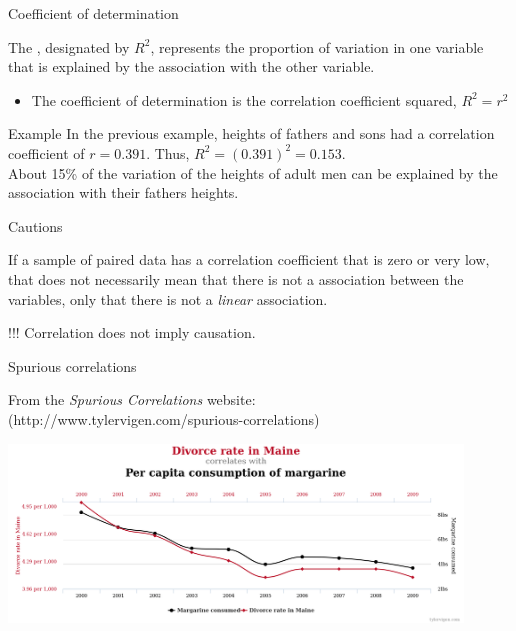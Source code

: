 \documentclass[xcolor=table, handout]{beamer}
\begin{document}
\begin{frame}{Coefficient of determination}
\begin{block}{}
\large
The , designated by $R^2$, represents the proportion of variation in one variable that is explained by the association with the other variable.
\begin{itemize}
\item The coefficient of determination is the correlation coefficient squared,  $R^2 = r^2$
\end{itemize}
\end{block}

\pause
\begin{exampleblock}{Example}
\large
In the previous example, heights of fathers and sons had a correlation coefficient of $r=0.391$. Thus, $R^2 = (0.391)^2 = 0.153$.\\
\medskip
About 15\% of the variation of the heights of adult men can be explained by the association with their fathers heights.
\end{exampleblock}
\end{frame}

\begin{frame}{Cautions}
\begin{block}{}
\large
If a sample of paired data has a correlation coefficient that is zero or very low, that does not necessarily mean that there is not a association between the variables, only that there is not a \emph{linear} association. 
\end{block}

\pause
\begin{alertblock}{!!!}
\Large
Correlation does not imply causation.
\end{alertblock}
\end{frame}

\begin{frame}{Spurious correlations}
\begin{block}{}
From the \emph{Spurious Correlations} website:\\ (http://www.tylervigen.com/spurious-correlations)
\end{block}
\bigskip
{\centering
\includegraphics[width=4.75in]{../images/ch10_cor_spur}
\par}

\end{frame}
\end{document}
